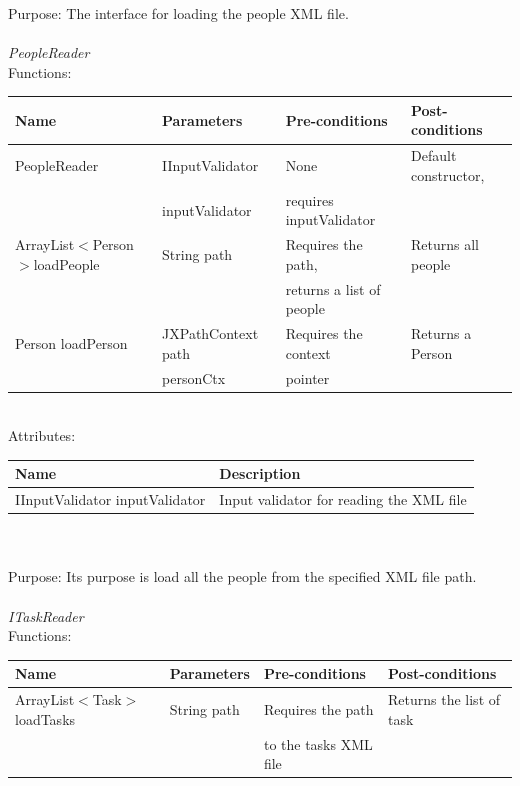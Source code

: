 Purpose: The interface for loading the people XML file.
\\
\\
\emph{PeopleReader}\\
Functions:\\
\begin{tabular}{| l | l | l | l |}
\hline
Name & Parameters & Pre-conditions & Post-conditions\\
\hline
		PeopleReader				& IInputValidator 	& None				& Default constructor, \\
							& inputValidator	&  requires inputValidator	& \\
		ArrayList$<$Person$>$loadPeople 	& String path       	& Requires the path,		& Returns all people\\
                                                                                    &                         	& returns a list of people 	 &\\
		Person loadPerson 			& JXPathContext path & Requires the context	& Returns a Person \\
                                                                                    & personCtx                & pointer			& 
\\
\hline
\end{tabular}
\\

Attributes:\\
\begin{tabular}{| l | l |}
\hline
 Name                                     	 	& Description\\
\hline
IInputValidator inputValidator		& Input validator for reading the XML file\\
\hline
\end{tabular}\\
\\

Purpose: Its purpose is load all the people from the specified XML file path.
\\
\\

\emph{ITaskReader}\\
Functions:\\
\begin{tabular}{| l | l | l | l |}
\hline
Name & Parameters & Pre-conditions & Post-conditions\\
\hline
		ArrayList$<$Task$>$loadTasks 	& String path       			& Requires the path 	& Returns the list of task\\
                                                                                    &                         			 & to the tasks XML file	& 
\\
\hline
\end{tabular}
\\

